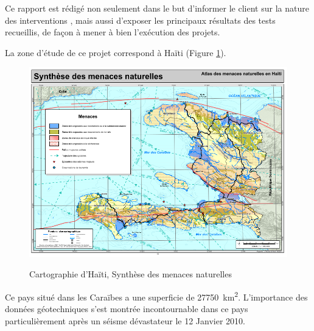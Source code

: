 Ce rapport est rédigé non seulement dans le but d’informer le client sur la nature des interventions
, mais aussi d’exposer les principaux résultats des tests recueillis, de façon à mener à bien
l’exécution des projets.
\par
La zone d'étude de ce projet correspond à Haïti (Figure \ref{fig:haiti}).
\begin{figure}
    \centering
    \includegraphics[width=1\textwidth]{images/Contexte/haiti.png}
    \caption{Cartographie d'Haïti, Synthèse des menaces naturelles  }\cite{ciat}
    \label{fig:haiti}
\end{figure}
Ce pays situé dans les Caraïbes a une superficie de  \SI{27750}{\kilo\metre\squared}\cite{superficie}.
L'importance des données géotechniques s'est montrée incontournable dans ce pays particulièrement 
après un séisme dévastateur le 12 Janvier 2010.


